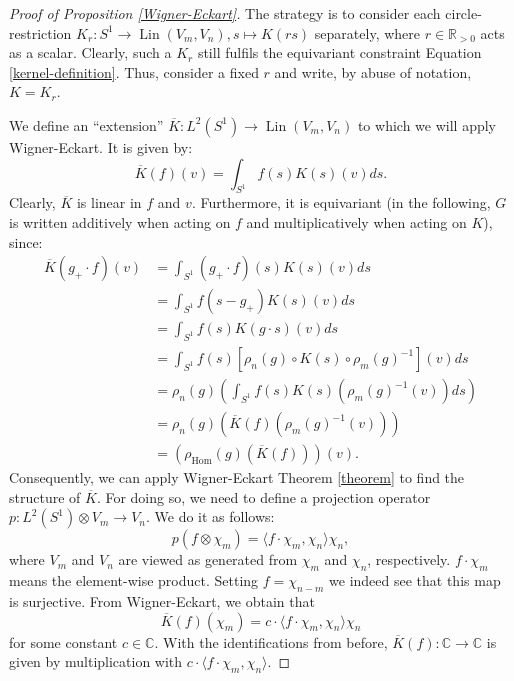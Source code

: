 \documentclass[12pt, a4paper]{article}
\theoremstyle{plain}
\theoremstyle{definition}
\theoremstyle{remark}
\newcommand{\C}{\mathds{C}}
\DeclareMathOperator{\lin}{Lin}
\begin{document}
\begin{proof}[Proof of Proposition \ref{Wigner-Eckart}]
The strategy is to consider each circle-restriction $K_r: S^1 \to \lin(V_m, V_n), s \mapsto K(rs)$ separately, where $r \in \mathbb{R}_{>0}$ acts as a scalar. Clearly, such a $K_r$ still fulfils the equivariant constraint Equation \ref{kernel-definition}. Thus, consider a fixed $r$ and write, by abuse of notation, $K = K_r$.

We define an ``extension'' $\overline{K}: L^2(S^1) \to \lin(V_m, V_{n})$ to which we will apply Wigner-Eckart. It is given by:
\begin{equation*}
\overline{K}(f)(v) = \int_{S^1}f(s)K(s)(v)ds.
\end{equation*}
Clearly, $\overline{K}$ is linear in $f$ and $v$. Furthermore, it is equivariant (in the following, $G$ is written additively when acting on $f$ and multiplicatively when acting on $K$), since:
\begin{align*}
\overline{K}(g_+ \cdot f)(v) & = \int_{S^1} (g_+\cdot f)(s) K(s)(v) ds \\
& = \int_{S^1} f(s - g_{+}) K(s)(v)ds \\
& = \int_{S^1} f(s) K(g\cdot s)(v)ds \\
& = \int_{S^1} f(s) \left[ \rho_{n}(g) \circ K(s) \circ \rho_m(g)^{-1}\right](v) ds  \\
& = \rho_n(g) \left( \int_{S^1} f(s) K(s) \left( \rho_m(g)^{-1}(v)\right)ds \right) \\
& = \rho_n(g) \left( \overline{K}(f)\left(\rho_m(g)^{-1}(v) \right)\right) \\
& = \left(\rho_{\text{Hom}}(g)\left( \overline{K}(f) \right)\right)(v).
\end{align*}
Consequently, we can apply Wigner-Eckart Theorem \ref{theorem} to find the structure of $\overline{K}$. For doing so, we need to define a projection operator $p: L^2(S^1) \otimes V_m \to V_n$. We do it as follows:
\begin{equation*}
p(f \otimes \chi_m) = \langle f \cdot \chi_m, \chi_n\rangle \chi_n,
\end{equation*}
where $V_m$ and $V_n$ are viewed as generated from $\chi_m$ and $\chi_n$, respectively. $f \cdot \chi_m$ means the element-wise product. Setting $f = \chi_{n-m}$ we indeed see that this map is surjective. From Wigner-Eckart, we obtain that
\begin{equation*}
\overline{K}(f)(\chi_m) = c \cdot \langle f \cdot \chi_m, \chi_n \rangle \chi_n
\end{equation*}
for some constant $c \in \C$. With the identifications from before, $\overline{K}(f): \C \to \C$ is given by multiplication with $c \cdot \langle f \cdot \chi_m, \chi_n \rangle$.


\end{proof}
\end{document}
